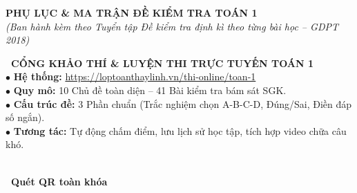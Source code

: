 
\begin{center}
  {\LARGE\bfseries\color{teal!90!black} PHỤ LỤC \& MA TRẬN ĐỀ KIỂM TRA TOÁN 1}\\[4pt]
  {\small\itshape (Ban hành kèm theo Tuyển tập Đề kiểm tra định kì theo từng bài học -- GDPT 2018)}
\end{center}
\vspace{2mm}

\begin{tcolorbox}[
  enhanced,
  colback=teal!5,
  colframe=teal!80!black,
  arc=3mm,
  boxrule=1pt,
  left=3mm, right=3mm, top=3mm, bottom=3mm
]
  \begin{minipage}[c]{0.74\textwidth}
    {\bfseries\color{teal!90!black}\large \faGraduationCap~CỔNG KHẢO THÍ \& LUYỆN THI TRỰC TUYẾN TOÁN 1}\\[3pt]
    \small
    $\bullet$ \textbf{Hệ thống:} \url{https://loptoanthaylinh.vn/thi-online/toan-1}\\
    $\bullet$ \textbf{Quy mô:} 10 Chủ đề toàn diện -- 41 Bài kiểm tra bám sát SGK.\\
    $\bullet$ \textbf{Cấu trúc đề:} 3 Phần chuẩn (Trắc nghiệm chọn A-B-C-D, Đúng/Sai, Điền đáp số ngắn).\\
    $\bullet$ \textbf{Tương tác:} Tự động chấm điểm, lưu lịch sử học tập, tích hợp video chữa câu khó.
  \end{minipage}
  \hfill
  \begin{minipage}[c]{0.23\textwidth}
    \centering
    \\[3pt]
    {\scriptsize\bfseries\faQrcode~Quét QR toàn khóa}
  \end{minipage}
\end{tcolorbox}

\vspace{3mm}

\vspace{1.5mm}

